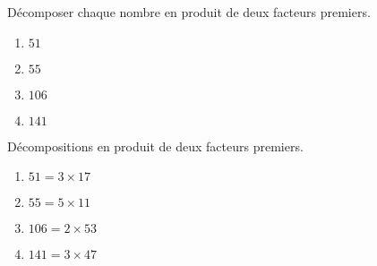 \begin{exercice*}
    \label{N2exosBase012}
    Décomposer chaque nombre en produit de deux facteurs premiers.
    \begin{enumerate}
        \item $51$
        \item $55$
        \item $106$
        \item $141$
    \end{enumerate}

\end{exercice*}
\begin{corrige}
    Décompositions en produit de deux facteurs premiers.
    
    \begin{enumerate}
        \item $51=3\times 17$
        \item $55=5\times 11$
        \item $106=2\times 53$
        \item $141=3\times 47$
    \end{enumerate}    
\end{corrige}

